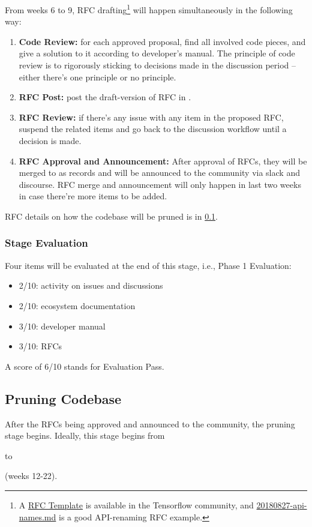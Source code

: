 From weeks 6 to 9, RFC drafting\footnote{A \href{https://github.com/tensorflow/community/blob/master/rfcs/yyyymmdd-rfc-template.md}{RFC Template} is available in the Tensorflow community, and \href{https://github.com/tensorflow/community/blob/master/rfcs/20180827-api-names.md}{20180827-api-names.md} is a good API-renaming RFC example.} will happen simultaneously in the following way:
\begin{enumerate}
    \item \textbf{Code Review:} for each approved proposal, find all involved code pieces, and give a solution to it according to developer's manual. The principle of code review is to rigorously sticking to decisions made in the discussion period -- either there's one principle or no principle.
    \item \textbf{RFC Post:} post the draft-version of RFC in \repogsoctempdoc{}.
    \item \textbf{RFC Review:} if there's any issue with any item in the proposed RFC, suspend the related items and go back to the discussion workflow until a decision is made.
    \item \textbf{RFC Approval and Announcement:} After approval of RFCs, they will be merged to \repoimagesgithubio{} as records and will be announced to the community via slack and discourse. RFC merge and announcement will only happen in last two weeks in case there're more items to be added.
\end{enumerate}
RFC details on how the codebase will be pruned is in \cref{subsec:prune}.

\subsubsection*{Stage Evaluation}

Four items will be evaluated at the end of this stage, i.e., \textsf{Phase 1 Evaluation}:
\begin{itemize}
    \item 2/10: activity on issues and discussions
    \item 2/10: ecosystem documentation
    \item 3/10: developer manual
    \item 3/10: RFCs
\end{itemize}
A score of 6/10 stands for \textsf{Evaluation Pass}.

\subsection{Pruning Codebase}\label{subsec:prune}
After the RFCs being approved and announced to the community, the pruning stage begins. Ideally, this stage begins from \date{July 1} to \date{August 26} (weeks 12-22).

